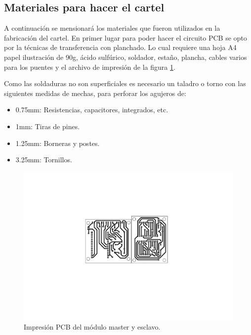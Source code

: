 \subsection{Materiales para hacer el cartel}\label{sec:materiales-para-hacer-cartel}

 A continuación se mensionará los materiales que fueron utilizados en la fabricación del cartel.
 En primer lugar para poder hacer el circuito PCB se opto por la técnicas de transferencia con planchado.
 Lo cual requiere una hoja A4 papel ilustración de 90g, ácido sulfúrico, soldador, estaño, plancha, cables varios para los puentes y el archivo de impresión de la figura \ref{fig:imp-pcb}.

 Como las soldaduras no son superficiales es necesario un taladro o torno con las siguientes medidas de mechas, para perforar los agujeros de:
 \begin{itemize}
     \item 0.75mm: Resistencias, capacitores, integrados, etc.
     \item 1mm: Tiras de pines.
     \item 1.25mm: Borneras y postes.
     \item 3.25mm: Tornillos.
 \end{itemize}

 \begin{figure}[ht!]
	\centering
	\includegraphics[width=\linewidth]{imagenes/hw/imp.pdf}
	\caption{Impresión PCB del módulo master y esclavo.}
	\label{fig:imp-pcb}
\end{figure}